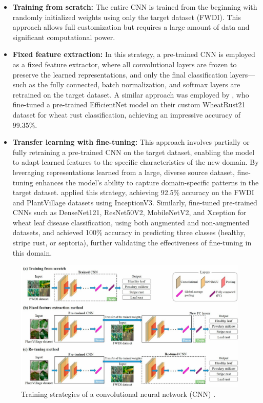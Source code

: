 \begin{itemize}
  \item \textbf{Training from scratch:} The entire CNN is trained from the beginning with randomly initialized weights using only the target dataset (FWDI). This approach allows full customization but requires a large amount of data and significant computational power.

  \item \textbf{Fixed feature extraction:} In this strategy, a pre-trained CNN is employed as a fixed feature extractor, where all convolutional layers are frozen to preserve the learned representations, and only the final classification layers—such as the fully connected, batch normalization, and softmax layers are retrained on the target dataset. A similar approach was employed by \parencite{nigam2023deep}, who fine-tuned a pre-trained EfficientNet model on their custom WheatRust21 dataset for wheat rust classification, achieving an impressive accuracy of 99.35\%.

  \item \textbf{Transfer learning with fine-tuning:} This approach involves partially or fully retraining a pre-trained CNN on the target dataset, enabling the model to adapt learned features to the specific characteristics of the new domain. By leveraging representations learned from a large, diverse source dataset, fine-tuning enhances the model’s ability to capture domain-specific patterns in the target dataset. \parencite{jiang2022evaluation} applied this strategy, achieving 92.5\% accuracy on the FWDI and PlantVillage datasets using InceptionV3. Similarly, \parencite{ramadan2024improving} fine-tuned pre-trained CNNs such as DenseNet121, ResNet50V2, MobileNetV2, and Xception for wheat leaf disease classification, using both augmented and non-augmented datasets, and achieved 100\% accuracy in predicting three classes (healthy, stripe rust, or septoria), further validating the effectiveness of fine-tuning in this domain.
\end{itemize}


\begin{figure}[H] 
    \centering
    \includegraphics[width=1\textwidth]{chapters/chapter3/images/Figure03.png}
    \caption{Training strategies of a convolutional neural network (CNN) \parencite{jiang2022evaluation}.}
    \label{fig:TrainingStrategies}
\end{figure}




